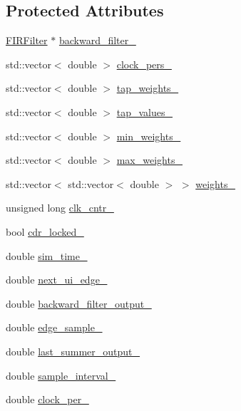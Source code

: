 \subsection*{Protected Attributes}
\begin{DoxyCompactItemize}
\item 
\hyperlink{class_f_i_r_filter}{F\+I\+R\+Filter} $\ast$ \hyperlink{class_d_f_e_aa6953c7cf764551e2f4b14f7ea1759a9}{backward\+\_\+filter\+\_\+}
\item 
std\+::vector$<$ double $>$ \hyperlink{class_d_f_e_ad7db74a287762cdc91d572a1c5345e69}{clock\+\_\+pers\+\_\+}
\item 
std\+::vector$<$ double $>$ \hyperlink{class_d_f_e_ae05f0b024c5cc05b0fb58c70c36e249a}{tap\+\_\+weights\+\_\+}
\item 
std\+::vector$<$ double $>$ \hyperlink{class_d_f_e_a863c529627c7b2b73fcff8bf1db03982}{tap\+\_\+values\+\_\+}
\item 
std\+::vector$<$ double $>$ \hyperlink{class_d_f_e_a9ccbe12d16eb4fb19dc69235fddd89c3}{min\+\_\+weights\+\_\+}
\item 
std\+::vector$<$ double $>$ \hyperlink{class_d_f_e_a469a8b4a5abe34c8fc769676a9c9ffbf}{max\+\_\+weights\+\_\+}
\item 
std\+::vector$<$ std\+::vector$<$ double $>$ $>$ \hyperlink{class_d_f_e_af23a84b8ec9cf7d1c8d445b8a0427f32}{weights\+\_\+}
\item 
unsigned long \hyperlink{class_d_f_e_aea5a17495cf769abac1ef67221500a4c}{clk\+\_\+cntr\+\_\+}
\item 
bool \hyperlink{class_d_f_e_aa50b830d84b9003160731dc0a0caa5c2}{cdr\+\_\+locked\+\_\+}
\item 
double \hyperlink{class_d_f_e_a0d576f9f42246365b5be98add1fe21d8}{sim\+\_\+time\+\_\+}
\item 
double \hyperlink{class_d_f_e_a3b73aff8ad9982b1585697d51dbeb038}{next\+\_\+ui\+\_\+edge\+\_\+}
\item 
double \hyperlink{class_d_f_e_a76d12aa6b5972a1d7aade0202c855699}{backward\+\_\+filter\+\_\+output\+\_\+}
\item 
double \hyperlink{class_d_f_e_a67ee30ee356638ea41589e47adf74b02}{edge\+\_\+sample\+\_\+}
\item 
double \hyperlink{class_d_f_e_af9c9a6e000775b9c20dfb78b80b77025}{last\+\_\+summer\+\_\+output\+\_\+}
\item 
double \hyperlink{class_d_f_e_ae99b54abc902423f71f31f7d37e86b78}{sample\+\_\+interval\+\_\+}
\item 
double \hyperlink{class_d_f_e_a0d12f483bb415b2fcb48849287bed8f2}{clock\+\_\+per\+\_\+}

\end{DoxyCompactItemize}
